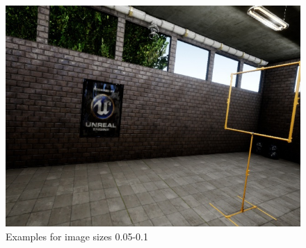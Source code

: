 \documentclass{article}
\begin{document}
\begin{figure}[htbp]
\begin{minipage}{0.3\linewidth}
		\includegraphics[width=\linewidth]{size_examples/005-01 (7).jpg}
	\end{minipage}
	\caption{Examples for image sizes 0.05-0.1}
\end{figure}
\end{document}
